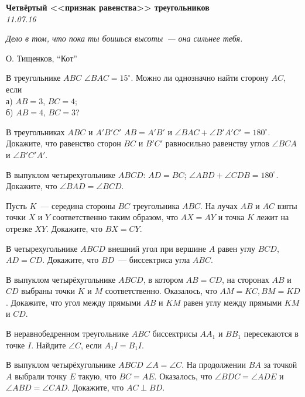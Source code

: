 \begin{center}
\textbf{\Large Четвёртый <<признак равенства>> треугольников}\\
\textit{11.07.16}
\end{center}

\epigraph{\it Дело в том, что пока ты боишься высоты~--- она сильнее тебя.}{О. Тищенков, ``Кот''}

\begin{problems}

\item В треугольнике $ABC$  $\angle BAC = 15^{\circ}$. Можно ли однозначно найти сторону $AC$, если\\
а) $AB = 3$, $BC = 4$;\\
б) $AB = 4$, $BC = 3$?

\item В треугольниках $ABC$ и $A'B'C'$  $AB=A'B'$ и $\angle BAC+\angle B'A'C'=180^{\circ}$. Докажите, что равенство сторон $BC$ и $B'C'$ равносильно равенству углов $\angle BCA$ и $\angle B'C'A'$.

\item В выпуклом четырехугольнике $ABCD$: $AD = BC$; $\angle ABD + \angle CDB = 180^{\circ}$. Докажите, что $\angle BAD = \angle BCD$.

\item Пусть $K$~--- середина стороны $BC$ треугольника $ABC$. На лучах $AB$ и $AC$ взяты точки $X$ и $Y$ соответственно таким образом, что $AX = AY$ и точка $K$ лежит на отрезке $XY$. Докажите, что $BX = CY$.

\item  В четырехугольнике $ABCD$ внешний угол при вершине $A$ равен углу $BCD$, $AD=CD$. Докажите, что $BD$~--- биссектриса угла $ABC$.

\item В выпуклом четырёхугольнике $ABCD$, в котором $AB = CD$, на сторонах $AB$ и $CD$ выбраны точки $K$ и $M$ соответственно. Оказалось, что $AM = KC, BM = KD$. Докажите, что угол между прямыми $AB$ и $KM$ равен углу между прямыми $KM$ и $CD$.

\item В неравнобедренном треугольнике $ABC$ биссектрисы $AA_1$ и $BB_1$ пересекаются в точке $I$. Найдите $\angle C$, 
если $A_1I=B_1I$.

\item В выпуклом четырёхугольнике $ABCD$ $\angle A=\angle C$. На продолжении $BA$ за точкой $A$ выбрали точку $E$ такую, что $BC=AE$. Оказалось, что $\angle BDC=\angle ADE$ и $\angle ABD= \angle CAD$. Докажите, что $AC \perp BD$.


\end{problems}
